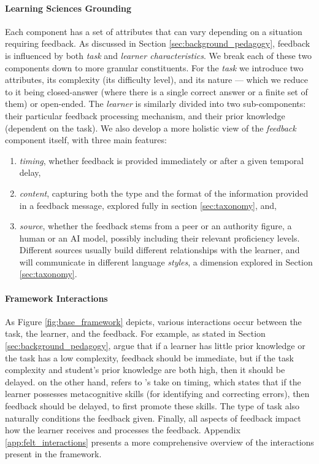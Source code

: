 \paragraph{Learning Sciences Grounding}
Each component has a set of attributes that can vary depending on a situation requiring feedback. 
As discussed in Section \ref{sec:background_pedagogy}, feedback is influenced by both \textit{task} and \textit{learner characteristics}. We break each of these two components down to more granular constituents. For the \textit{task} we introduce two attributes, its complexity (\ie its difficulty level), and its nature --- which we reduce to it being closed-answer (where there is a single correct answer or a finite set of them) or open-ended. The \textit{learner} is similarly divided into two sub-components: their particular feedback processing mechanism, and their prior knowledge (dependent on the task).
We also develop a more holistic view of the \textit{feedback} component itself, with three main features:
\begin{enumerate}[itemsep=0.05em,label=(\roman*)]
    \item \textit{timing}, whether feedback is provided immediately or after a given temporal delay,
    \item \textit{content}, capturing both the type and the format of the information provided in a feedback message, explored fully in section \ref{sec:taxonomy},
    and,
    \item \textit{source}, whether the feedback stems from a peer or an authority figure, a human or an AI model, possibly including their relevant proficiency levels. Different sources usually build different relationships with the learner, and will communicate in different language \textit{styles}, a dimension explored in Section \ref{sec:taxonomy}.
\end{enumerate}

\paragraph{Framework Interactions} As Figure \ref{fig:base_framework} depicts, various interactions occur between the task, the learner, and the feedback. For example, as stated in Section \ref{sec:background_pedagogy}, \citet{mason_providing_2001} argue that if a learner has little prior knowledge or the task has a low complexity, feedback should be immediate, but if the task complexity and student's prior knowledge are both high, then it should be delayed. \citet{narciss_feedback_2008} on the other hand, refers to \citet{Mathan2005FosteringTI}'s take on timing, which states that if the learner possesses metacognitive skills (for identifying and correcting errors), then feedback should be delayed, to first promote these skills.
The type of task also naturally conditions the feedback given. 
Finally, all aspects of feedback impact how the learner receives and processes the feedback.
Appendix \ref{app:felt_interactions} presents a more comprehensive overview of the interactions present in the framework.


